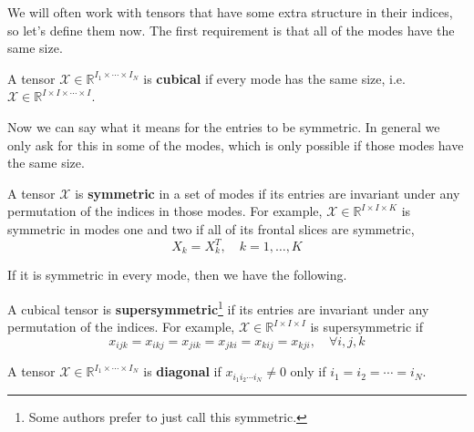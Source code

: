   We will often work with tensors that have some extra structure in their indices, so let's define them now. The first requirement is that all of the modes have the same size.

  \begin{definition}
    \label{def:cubical-tensor}
    A tensor $\mathcal{X} \in \mathbb{R}^{I_1 \times \cdots \times I_N}$ is \textbf{cubical} if every mode has the same size, i.e. $\mathcal{X} \in \mathbb{R}^{I \times I \times \cdots \times I}$.
  \end{definition}

  Now we can say what it means for the entries to be symmetric. In general we only ask for this in some of the modes, which is only possible if those modes have the same size.

  \begin{definition}
    \label{def:symmetric-tensor}
    A tensor $\mathcal{X}$ is \textbf{symmetric} in a set of modes if its entries are invariant under any permutation of the indices in those modes. For example, $\mathcal{X} \in \mathbb{R}^{I \times I \times K}$ is symmetric in modes one and two if all of its frontal slices are symmetric,
    \begin{equation}
      X_k = X_k^T, \quad k = 1, \ldots, K
    \end{equation}
  \end{definition}

  If it is symmetric in every mode, then we have the following.

  \begin{definition}
    \label{def:supersymmetric-tensor}
    A cubical tensor is \textbf{supersymmetric}\footnote{Some authors prefer to just call this symmetric.} if its entries are invariant under any permutation of the indices. For example, $\mathcal{X} \in \mathbb{R}^{I \times I \times I}$ is supersymmetric if
    \begin{equation}
      x_{ijk} = x_{ikj} = x_{jik} = x_{jki} = x_{kij} = x_{kji}, \quad \forall i, j, k
    \end{equation}
  \end{definition}

  \begin{definition}
    \label{def:diagonal-tensor}
    A tensor $\mathcal{X} \in \mathbb{R}^{I_1 \times \cdots \times I_N}$ is \textbf{diagonal} if $x_{i_1 i_2 \cdots i_N} \neq 0$ only if $i_1 = i_2 = \cdots = i_N$.
  \end{definition}

